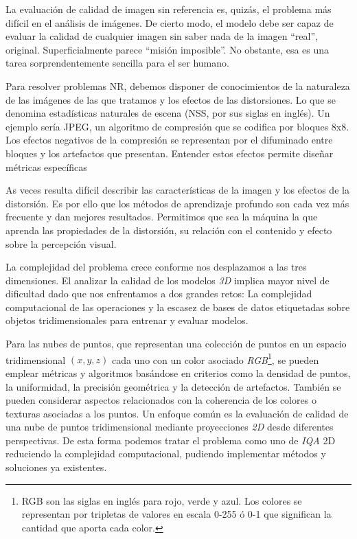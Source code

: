 La evaluación de calidad de imagen sin referencia es, quizás, el problema 
más difícil en el análisis de imágenes. De cierto modo, el modelo debe ser 
capaz de evaluar la calidad de cualquier imagen sin saber nada de la imagen ``real'', original. 
Superficialmente parece ``misión imposible''. No obstante, esa 
es una tarea sorprendentemente sencilla para el ser humano\cite{Wang2006ModernIQ}. 

Para resolver problemas NR, debemos disponer de conocimientos de la naturaleza de las imágenes 
de las que tratamos y los efectos de las distorsiones. Lo que se denomina 
estadísticas naturales de escena (NSS, por sus siglas en inglés). Un ejemplo 
sería JPEG, un algoritmo de compresión que se codifica por bloques 8x8. Los efectos
negativos de la compresión se representan por el difuminado entre bloques y los artefactos que presentan.
Entender estos efectos permite diseñar métricas específicas\cite{SpatialDomainForJPEG, FrecuencyDomainForJPEG}

As veces resulta difícil describir las características de la imagen y los efectos 
de la distorsión. Es por ello que los métodos de aprendizaje profundo son cada vez 
más frecuente y dan mejores resultados. Permitimos que sea la máquina la que aprenda 
las propiedades de la distorsión, su relación con el contenido y efecto sobre la 
percepción visual\cite{Hallucinated-IQA, BIQA, DIPIQA}. 

La complejidad del problema crece conforme nos desplazamos a las tres dimensiones. 
El analizar la calidad de los modelos \emph{3D} implica mayor nivel de dificultad 
dado que nos enfrentamos a dos grandes retos: La complejidad computacional 
de las operaciones y la escasez de bases de datos etiquetadas
sobre objetos tridimensionales para entrenar y evaluar modelos. 

 
Para las nubes de puntos, que representan una colección de puntos en un espacio 
tridimensional $(x,y,z)$ cada uno con un color asociado \emph{RGB}\footnote{
  RGB son las siglas en inglés para rojo, verde y azul. Los colores se representan 
  por tripletas de valores en escala 0-255 ó 0-1 que significan la cantidad que aporta 
  cada color. 
}, se pueden emplear métricas y algoritmos basándose en criterios como la 
densidad de puntos, la uniformidad, la precisión geométrica y la detección de artefactos.
También se pueden considerar aspectos relacionados con la coherencia de los colores 
o texturas asociadas a los puntos\cite{NR3DQA, StructureGuidedResampling, GPA-NET}.
Un enfoque común es la evaluación de calidad de una nube de puntos tridimensional 
mediante proyecciones \emph{2D} desde diferentes perspectivas\cite{IT-PCQA, VQA-PC, MM-PCQA}. 
De esta forma podemos tratar el problema como uno de \emph{IQA} 2D reduciendo la 
complejidad computacional, pudiendo implementar métodos y soluciones ya existentes.

